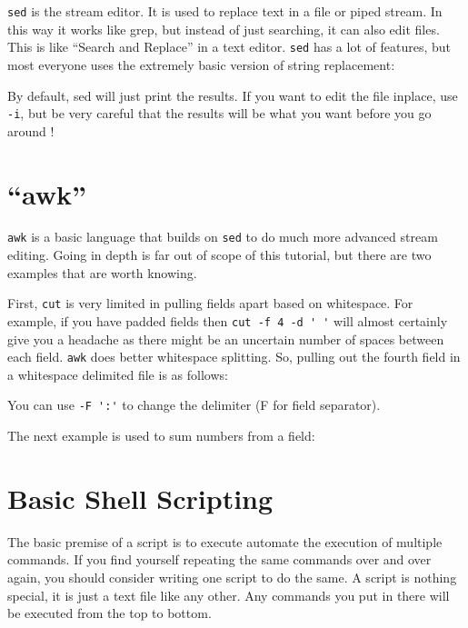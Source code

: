 \verb|sed| is the stream editor. It is used to replace text in a
file or piped stream. In this way it works like grep, but instead of just
searching, it can also edit files. This is like ``Search and Replace'' in a text
editor. \verb|sed| has a lot of features, but most everyone uses the extremely
basic version of string replacement:

\begin{prompt}
\end{prompt}

By default, sed will just print the results. If you want to edit the file inplace, use
\verb|-i|, but be very careful that the results will be what you want before you go
around !

\section{``awk''}
\verb|awk| is a basic language that builds on \verb|sed| to do much more advanced
stream editing. Going in depth is far out of scope of this tutorial, but there
are two examples that are worth knowing.

First, \verb|cut| is very limited in pulling fields apart based on whitespace. For
example, if you have padded fields then \verb|cut -f 4 -d ' '| will almost
certainly give you a headache as there might be an uncertain number of spaces
between each field. \verb|awk| does better whitespace splitting. So, pulling out
the fourth field in a whitespace delimited file is as follows:

\begin{prompt}
\end{prompt}

You can use \verb|-F ':'| to change the delimiter (F for field separator).

The next example is used to sum numbers from a field:

\begin{prompt}
\end{prompt}

\section{Basic Shell Scripting}

The basic premise of a script is to execute automate the execution of multiple
commands. If you find yourself repeating the same commands over and over again,
you should consider writing one script to do the same.  A script is nothing
special, it is just a text file like any other. Any commands you put in there
will be executed from the top to bottom.

